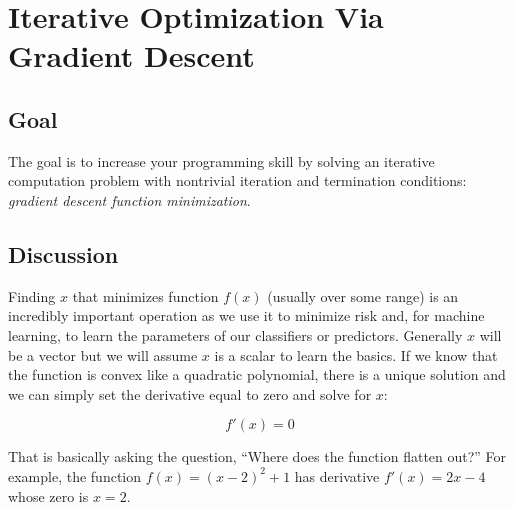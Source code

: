 \documentclass[titlepage]{tufte-book}
\newcounter{problem}
\begin{document}
\chapter{Iterative Optimization Via Gradient Descent}

\section{Goal}

\begin{fullwidth}

The goal is to increase your programming skill by solving an iterative computation problem with nontrivial iteration and termination conditions: {\em gradient descent function minimization}. 

\section{Discussion}

Finding $x$ that minimizes function $f(x)$ (usually over some range) is an incredibly important operation as we use it to minimize risk and, for machine learning, to learn the parameters of our classifiers or predictors. Generally $x$ will be a vector but we will assume $x$ is a scalar to learn the basics. If we know that the function is convex like a quadratic polynomial, there is a unique solution and we can simply set the derivative equal to zero and solve for $x$:

\[\tag{Analytic solution to optimization}
f'(x) = 0
\]

\noindent That is basically asking the question, ``Where does the function flatten out?''  For example, the function $f(x) = (x-2)^2 + 1$ has derivative $f'(x) = 2x - 4$ whose zero is $x=2$.

\begin{center}
\end{center}


\end{fullwidth}
\end{document}
